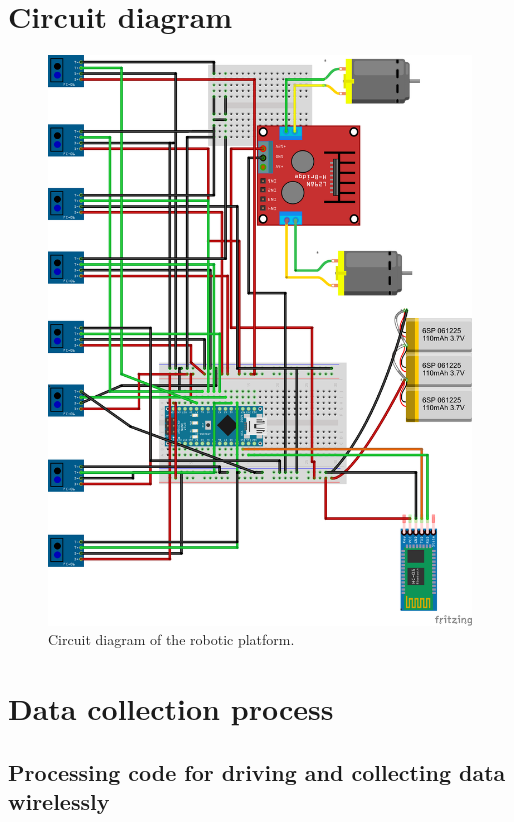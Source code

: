 \documentclass[14pt,a4paper]{extarticle}
\begin{document}
	\section{Circuit diagram}
	
		\begin{figure}[H]
			\includegraphics[left, scale = 0.8]{ckt_diagram.png}
			\caption{Circuit diagram of the robotic platform.}
		\end{figure}
	
	
	\section{Data collection process}
	
	\subsection{Processing code for driving and collecting data wirelessly}
	
\end{document}
